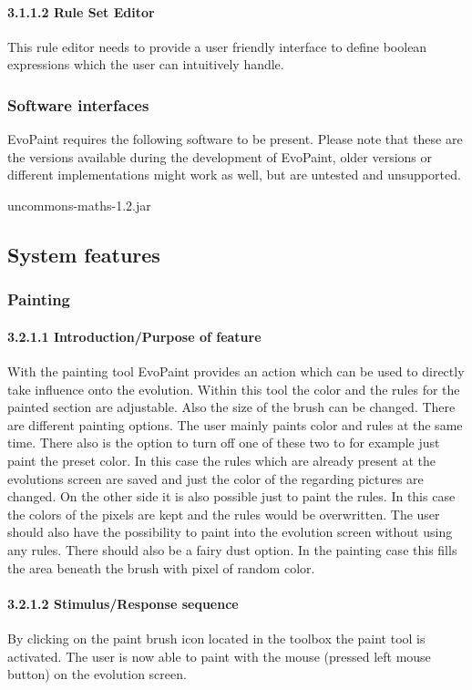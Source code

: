 \documentclass[titlepage,12pt]{scrartcl}
\begin{document}
\paragraph{3.1.1.2	Rule Set Editor}
This rule editor needs to provide a user friendly interface to define boolean expressions which the user can intuitively handle.

\subsubsection{Software interfaces}
EvoPaint requires the following software to be present. Please note that these are the versions available during the development of EvoPaint, older versions or different implementations might work as well, but are untested and unsupported. 

uncommons-maths-1.2.jar

\subsection{System features}
\subsubsection{Painting}
\paragraph{3.2.1.1	Introduction/Purpose of feature}
With the painting tool EvoPaint provides an action which can be used to directly take influence onto the evolution. Within this tool the color and the rules for the painted section are adjustable. Also the size of the brush can be changed. There are different painting options. The user mainly paints color and rules at the same time. There also is the option to turn off one of these two to for example just paint the preset color. In this case the rules which are already present at the evolutions screen are saved and just the color of the regarding pictures are changed. On the other side it is also possible just to paint the rules. In this case the colors of the pixels are kept and the rules would be overwritten. The user should also have the possibility to paint into the evolution screen without using any rules. 
There should also be a fairy dust option. In the painting case this fills the area beneath the brush with pixel of random color.

\paragraph{3.2.1.2	Stimulus/Response sequence}
By clicking on the paint brush icon located in the toolbox the paint tool is activated. 
The user is now able to paint with the mouse (pressed left mouse button) on the evolution screen.
\end{document}
